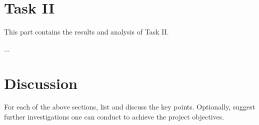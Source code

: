 \documentclass[10pt]{article} %
\begin{document}
 

\section*{Task II}
This part contains the results and analysis of Task II.

...

\section*{Discussion}
For each of the above sections, list and discuss the key points. Optionally, suggest further investigations one can conduct to achieve the project objectives.





\end{document}
